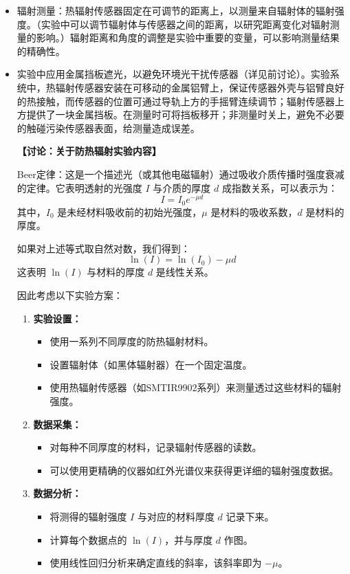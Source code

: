 \documentclass[dvipsnames, svgnames,a4paper,11pt]{article}
\begin{document}
\begin{enumerate}
\begin{itemize}
			\item 辐射测量：热辐射传感器固定在可调节的距离上，以测量来自辐射体的辐射强度。（实验中可以调节辐射体与传感器之间的距离，以研究距离变化对辐射测量的影响。）辐射距离和角度的调整是实验中重要的变量，可以影响测量结果的精确性。
			
			\item 实验中应用金属挡板遮光，以避免环境光干扰传感器（详见前讨论）。实验系统中，热辐射传感器安装在可移动的金属铝臂上，保证传感器外壳与铝臂良好的热接触，而传感器的位置可通过导轨上方的手摇臂连续调节；辐射传感器上方提供了一块金属挡板。在测量时可将挡板移开；非测量时关上，避免不必要的触碰污染传感器表面，给测量造成误差。
			
			\quad
			
			\textbf{【讨论：关于防热辐射实验内容】}
			
				Beer定律：这是一个描述光（或其他电磁辐射）通过吸收介质传播时强度衰减的定律。它表明透射的光强度 \(I\) 与介质的厚度 \(d\) 成指数关系，可以表示为：
				\[
				I = I_0 e^{-\mu d}
				\]
				其中，\(I_0\) 是未经材料吸收前的初始光强度，\(\mu\) 是材料的吸收系数，\(d\) 是材料的厚度。
				
				如果对上述等式取自然对数，我们得到：
				\[
				\ln(I) = \ln(I_0) - \mu d
				\]
				这表明 \(\ln(I)\) 与材料的厚度 \(d\) 是线性关系。
				
				因此考虑以下实验方案：
				\begin{enumerate}
					\item \textbf{实验设置：}
					\begin{itemize}
						\item 使用一系列不同厚度的防热辐射材料。
						\item 设置辐射体（如黑体辐射器）在一个固定温度。
						\item 使用热辐射传感器（如SMTIR9902系列）来测量透过这些材料的辐射强度。
					\end{itemize}
					
					\item \textbf{数据采集：}
					\begin{itemize}
						\item 对每种不同厚度的材料，记录辐射传感器的读数。
						\item 可以使用更精确的仪器如红外光谱仪来获得更详细的辐射强度数据。
					\end{itemize}
					
					\item \textbf{数据分析：}
					\begin{itemize}
						\item 将测得的辐射强度 \(I\) 与对应的材料厚度 \(d\) 记录下来。
						\item 计算每个数据点的 \(\ln(I)\)，并与厚度 \(d\) 作图。
						\item 使用线性回归分析来确定直线的斜率，该斜率即为 \(-\mu\)。
					\end{itemize}
					

\end{enumerate}
\end{itemize}
\end{enumerate}
\end{document}
